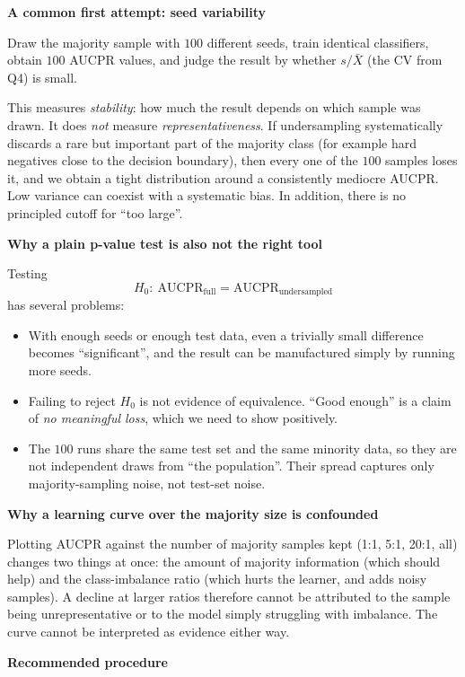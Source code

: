 \documentclass[11pt]{article}
\begin{document}
\textbf{A common first attempt: seed variability}

Draw the majority sample with \(100\) different seeds, train identical classifiers, obtain \(100\) AUCPR values, and judge the result by whether \(s/\bar X\) (the CV from Q4) is small.

This measures \emph{stability}: how much the result depends on which sample was drawn. It does \emph{not} measure \emph{representativeness}. If undersampling systematically discards a rare but important part of the majority class (for example hard negatives close to the decision boundary), then every one of the \(100\) samples loses it, and we obtain a tight distribution around a consistently mediocre AUCPR. Low variance can coexist with a systematic bias. In addition, there is no principled cutoff for ``too large''.

\textbf{Why a plain p-value test is also not the right tool}

Testing
\[
H_0:\ \mathrm{AUCPR}_{\text{full}}=\mathrm{AUCPR}_{\text{undersampled}}
\]
has several problems:
\begin{itemize}
    \item With enough seeds or enough test data, even a trivially small difference becomes ``significant'', and the result can be manufactured simply by running more seeds.
    \item Failing to reject \(H_0\) is not evidence of equivalence. ``Good enough'' is a claim of \emph{no meaningful loss}, which we need to show positively.
    \item The \(100\) runs share the same test set and the same minority data, so they are not independent draws from ``the population''. Their spread captures only majority-sampling noise, not test-set noise.
\end{itemize}

\textbf{Why a learning curve over the majority size is confounded}

Plotting AUCPR against the number of majority samples kept (1:1, 5:1, 20:1, all) changes two things at once: the amount of majority information (which should help) and the class-imbalance ratio (which hurts the learner, and adds noisy samples). A decline at larger ratios therefore cannot be attributed to the sample being unrepresentative or to the model simply struggling with imbalance. The curve cannot be interpreted as evidence either way.

\textbf{Recommended procedure}
\end{document}
